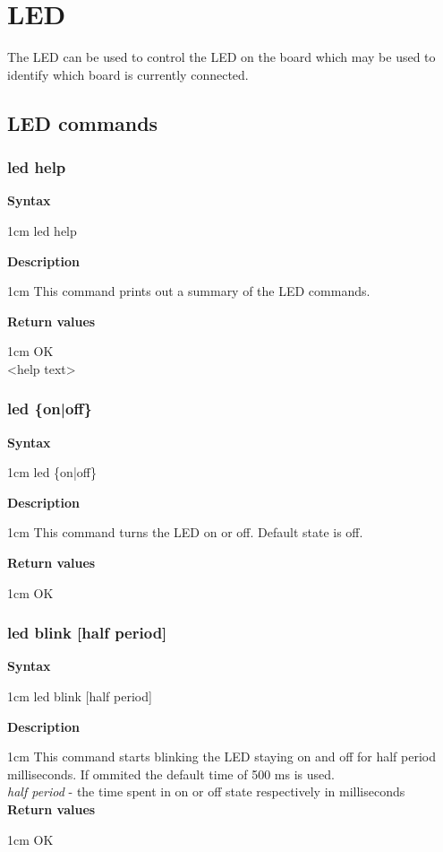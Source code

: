 \documentclass{article}[a4paper]
\begin{document}
\section{LED}
The LED can be used to control the LED on the board which may be used to
identify which board is currently connected.

\subsection{LED commands}
\subsubsection{led help}
\begin{tcolorbox}
	{\bf Syntax}

	 1cm \dimexpr\linewidth-2cm\relax
	led help

	\medskip
	{\bf Description}

	 1cm \dimexpr\linewidth-2cm\relax
	This command prints out a summary of the LED commands.

	\medskip
	{\bf Return values}

	 1cm \dimexpr\linewidth-2cm\relax
	OK \\
	<help text>
\end{tcolorbox}

\subsubsection{led \{on|off\}}
\begin{tcolorbox}
	{\bf Syntax}

	 1cm \dimexpr\linewidth-2cm\relax
	led \{on|off\}

	\medskip
	{\bf Description}

	 1cm \dimexpr\linewidth-2cm\relax
	This command turns the LED on or off.
	Default state is off.

	\medskip
	{\bf Return values}

	 1cm \dimexpr\linewidth-2cm\relax
	OK
\end{tcolorbox}

\subsubsection{led blink [half period]}
\begin{tcolorbox}
	{\bf Syntax}

	 1cm \dimexpr\linewidth-2cm\relax
	led blink [half period]

	\medskip
	{\bf Description}

	 1cm \dimexpr\linewidth-2cm\relax
	This command starts blinking the LED staying on and off for half period
	milliseconds. If ommited the default time of 500 ms is used.
	\medskip \\
	{\it half period} - the time spent in on or off state respectively in milliseconds \\

	\medskip
	{\bf Return values}

	 1cm \dimexpr\linewidth-2cm\relax
	OK
\end{tcolorbox}
\end{document}
